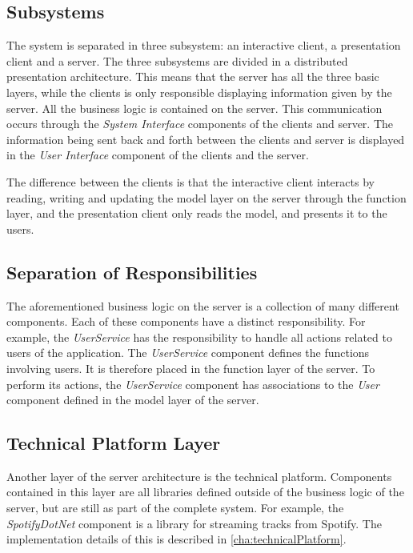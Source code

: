 \subsection{Subsystems}
The system is separated in three subsystem: an interactive client, a presentation client and a server. The three subsystems are divided in a distributed presentation architecture. This means that the server has all the three basic layers, while the clients is only responsible displaying information given by the server. All the business logic is contained on the
server. This communication occurs through the \textit{System Interface}
components of the clients and server. The information being sent back and
forth between the clients and server is displayed in the \textit{User Interface}
component of the clients and the server.

The difference between the clients is that the interactive client interacts by reading, writing and updating the model layer on the server through the function layer, and the presentation client only reads the model, and presents it to the users.

\subsection{Separation of Responsibilities}
The aforementioned business logic on the server is a collection of
many different components. Each of these components have a distinct
responsibility. For example, the \textit{UserService} has the responsibility to
handle all actions related to users of the application. The
\textit{UserService} component defines the functions involving users. It is
therefore placed in the function layer of the server. To perform its
actions, the \textit{UserService} component has associations to the \textit{User}
component defined in the model layer of the server.

\subsection{Technical Platform Layer}

Another layer of the server architecture is the
technical platform. Components contained in this layer are all
libraries defined outside of the business logic of the server, but are
still as part of the complete system. For example, the
\textit{SpotifyDotNet} component is a library for streaming tracks from
Spotify. The implementation details of this is described in
\cref{cha:technicalPlatform}.
